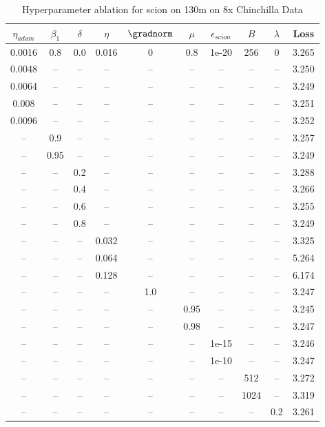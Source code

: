 \begin{table}[h!]
\centering
\caption{Hyperparameter ablation for scion on 130m on 8x Chinchilla Data}
\label{tab:ablation_scion_130m_on_8x_chinchilla_data}
\begin{tabular}{cccccccccc}
\toprule
$\eta_{adam}$ & $\beta_1$ & $\delta$ & $\eta$ & $\gradnorm$ & $\mu$ & $\epsilon_{scion}$ & $B$ & $\lambda$ & Loss \\
\midrule
0.0016 & 0.8 & 0.0 & 0.016 & 0 & 0.8 & 1e-20 & 256 & 0 & 3.265 \\
\midrule
0.0048 & -- & -- & -- & -- & -- & -- & -- & -- & 3.250 \\
0.0064 & -- & -- & -- & -- & -- & -- & -- & -- & 3.249 \\
0.008 & -- & -- & -- & -- & -- & -- & -- & -- & 3.251 \\
0.0096 & -- & -- & -- & -- & -- & -- & -- & -- & 3.252 \\
-- & 0.9 & -- & -- & -- & -- & -- & -- & -- & 3.257 \\
-- & 0.95 & -- & -- & -- & -- & -- & -- & -- & 3.249 \\
-- & -- & 0.2 & -- & -- & -- & -- & -- & -- & 3.288 \\
-- & -- & 0.4 & -- & -- & -- & -- & -- & -- & 3.266 \\
-- & -- & 0.6 & -- & -- & -- & -- & -- & -- & 3.255 \\
-- & -- & 0.8 & -- & -- & -- & -- & -- & -- & 3.249 \\
-- & -- & -- & 0.032 & -- & -- & -- & -- & -- & 3.325 \\
-- & -- & -- & 0.064 & -- & -- & -- & -- & -- & 5.264 \\
-- & -- & -- & 0.128 & -- & -- & -- & -- & -- & 6.174 \\
-- & -- & -- & -- & 1.0 & -- & -- & -- & -- & 3.247 \\
-- & -- & -- & -- & -- & 0.95 & -- & -- & -- & 3.245 \\
-- & -- & -- & -- & -- & 0.98 & -- & -- & -- & 3.247 \\
-- & -- & -- & -- & -- & -- & 1e-15 & -- & -- & 3.246 \\
-- & -- & -- & -- & -- & -- & 1e-10 & -- & -- & 3.247 \\
-- & -- & -- & -- & -- & -- & -- & 512 & -- & 3.272 \\
-- & -- & -- & -- & -- & -- & -- & 1024 & -- & 3.319 \\
-- & -- & -- & -- & -- & -- & -- & -- & 0.2 & 3.261 \\
\bottomrule
\end{tabular}
\end{table}

